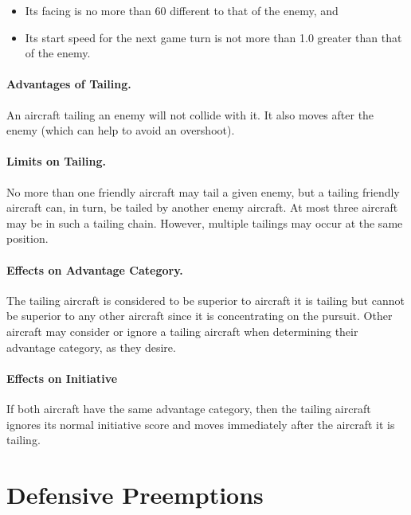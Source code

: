{\begin{itemize}

    \item Its facing is no more than 60{\deg} different to that of the enemy, and
    
    \item Its start speed for the next game turn is not more than 1.0 greater than that of the enemy.

\end{itemize}

\paragraph{Advantages of Tailing.} An aircraft tailing an enemy will not collide with it. It also moves after the enemy (which can help to avoid an overshoot).

\paragraph{Limits on Tailing.} No more than one friendly aircraft may tail a given enemy, but a tailing friendly aircraft can, in turn, be tailed by another enemy aircraft. At most three aircraft may be in such a tailing chain. However, multiple tailings may occur at the same position.

\paragraph{Effects on Advantage Category.} The tailing aircraft is considered to be superior to aircraft it is tailing but cannot be superior to any other aircraft since it is concentrating on the pursuit. Other aircraft may consider or ignore a tailing aircraft when determining their advantage category, as they desire.

\paragraph{Effects on Initiative} If both aircraft have the same advantage category, then the tailing aircraft ignores its normal initiative score and moves immediately after the aircraft it is tailing.
}

\section{Defensive Preemptions}
\label{rule:defensive-preemptions}


